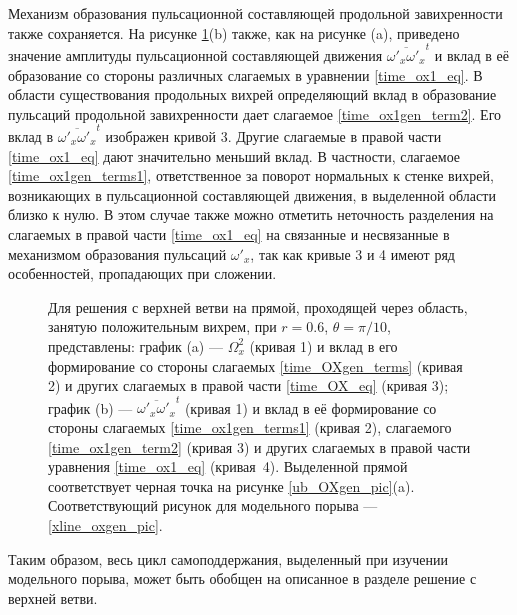 Механизм образования пульсационной составляющей продольной завихренности также сохраняется. На рисунке \ref{ub_oxgen_lines_pic}(b) также, как на рисунке (a), приведено значение амплитуды пульсационной составляющей движения $\overline{\omega'_x\omega'_x}^t$ и вклад в её образование со стороны различных слагаемых в уравнении \eqref{time_ox1_eq}. В области существования продольных вихрей определяющий вклад в образование пульсаций продольной завихренности дает слагаемое \eqref{time_ox1gen_term2}. Его вклад в $\overline{\omega'_x\omega'_x}^t$ изображен кривой 3. Другие слагаемые в правой части \eqref{time_ox1_eq} дают значительно меньший вклад. В частности, слагаемое \eqref{time_ox1gen_terms1}, ответственное за поворот нормальных к стенке вихрей, возникающих в пульсационной составляющей движения, в выделенной области близко к нулю. В этом случае также можно отметить неточность разделения на слагаемых в правой части \eqref{time_ox1_eq} на связанные и несвязанные в механизмом образования пульсаций $\omega'_x$, так как кривые 3 и 4 имеют ряд особенностей, пропадающих при сложении.

\begin{figure}
\caption{Для решения с верхней ветви на прямой, проходящей через область, занятую положительным вихрем, при $r = 0.6$, $\theta = \pi/10$, представлены: график (a) --- $\Omega_x^2$ (кривая 1) и вклад в его формирование со стороны слагаемых \eqref{time_OXgen_terms} (кривая 2) и других слагаемых в правой части \eqref{time_OX_eq} (кривая 3); график (b) --- $\overline{\omega'_x\omega'_x}^t$ (кривая 1) и вклад в её формирование со стороны слагаемых \eqref{time_ox1gen_terms1} (кривая 2), слагаемого \eqref{time_ox1gen_term2} (кривая 3) и других слагаемых в правой части уравнения \eqref{time_ox1_eq} (кривая~4). Выделенной прямой соответствует черная точка на рисунке \ref{ub_OXgen_pic}(a). Соответствующий рисунок для модельного порыва --- \ref{xline_oxgen_pic}.} 
\label{ub_oxgen_lines_pic}
\end{figure}

Таким образом, весь цикл самоподдержания, выделенный при изучении модельного порыва, может быть обобщен на описанное в разделе решение с верхней ветви. 

\begin{comment}
\begin{figure}
\center{\texttt{[image: ub\_ox1gen\_map.png]}}
\caption{Для решения с верхней ветви в сечении, где амплитуда пульсаций достигает наибольшей величины, представлена величина $\overline{\omega'_x \omega'_x}^t$ (график a) и вклад в её формирование со стороны слагаемых \eqref{time_ox1gen_terms1} (график b),  слагаемых  \eqref{time_ox1gen_term2} (график с) и других слагаемых в правой части уравнения \eqref{time_ox1_eq} (график d). }
\label{ub_ox1gen_pic}
\end{figure}
\end{comment}

